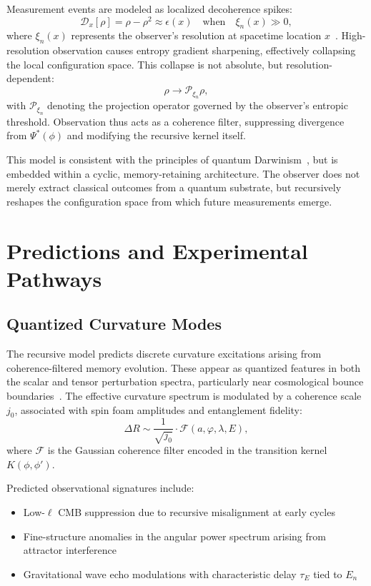 \documentclass[11pt]{article}
\begin{document}
Measurement events are modeled as localized decoherence spikes:
\[
\mathcal{D}_x[\rho] = \rho - \rho^2 \approx \epsilon(x) \quad \text{when} \quad \xi_n(x) \gg 0,
\]
where $\xi_n(x)$ represents the observer’s resolution at spacetime location $x$~\cite{zurek2003decoherence}. High-resolution observation causes entropy gradient sharpening, effectively collapsing the local configuration space. This collapse is not absolute, but resolution-dependent:
\[
\rho \to \mathcal{P}_{\xi_n} \rho,
\]
with $\mathcal{P}_{\xi_n}$ denoting the projection operator governed by the observer's entropic threshold. Observation thus acts as a coherence filter, suppressing divergence from $\Psi^*(\phi)$ and modifying the recursive kernel itself.

This model is consistent with the principles of quantum Darwinism~\cite{zurek2003decoherence}, but is embedded within a cyclic, memory-retaining architecture. The observer does not merely extract classical outcomes from a quantum substrate, but recursively reshapes the configuration space from which future measurements emerge.







\section{Predictions and Experimental Pathways}

\subsection{Quantized Curvature Modes}

The recursive model predicts discrete curvature excitations arising from coherence-filtered memory evolution. These appear as quantized features in both the scalar and tensor perturbation spectra, particularly near cosmological bounce boundaries~\cite{ashtekar2006quantum}. The effective curvature spectrum is modulated by a coherence scale $j_0$, associated with spin foam amplitudes and entanglement fidelity:
\[
\Delta R \sim \frac{1}{\sqrt{j_0}} \cdot \mathcal{F}(a, \varphi, \lambda, E),
\]
where $\mathcal{F}$ is the Gaussian coherence filter encoded in the transition kernel $K(\phi, \phi')$.

Predicted observational signatures include:

\begin{itemize}[leftmargin=1.5em]
\item Low-$\ell$ CMB suppression due to recursive misalignment at early cycles~\cite{planck2018cmb}
\item Fine-structure anomalies in the angular power spectrum arising from attractor interference
\item Gravitational wave echo modulations with characteristic delay $\tau_E$ tied to $E_n$~\cite{cardoso2016echoes}
\end{itemize}
\end{document}
